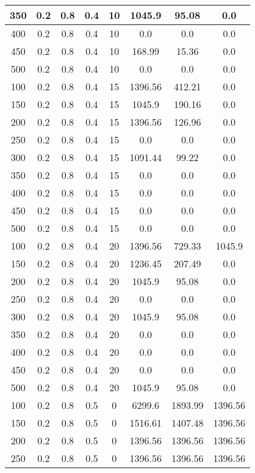 \documentclass[a4paper, 12pt]{extreport}
\begin{document}
\begin{itemize}
\begin{longtable}{|c|c|c|c|c|c|c|c|}
			350 & 0.2 & 0.8 & 0.4 & 10 & 1045.9 & 95.08 & 0.0 \\\hline
			400 & 0.2 & 0.8 & 0.4 & 10 & 0.0 & 0.0 & 0.0 \\\hline
			450 & 0.2 & 0.8 & 0.4 & 10 & 168.99 & 15.36 & 0.0 \\\hline
			500 & 0.2 & 0.8 & 0.4 & 10 & 0.0 & 0.0 & 0.0 \\\hline
			100 & 0.2 & 0.8 & 0.4 & 15 & 1396.56 & 412.21 & 0.0 \\\hline
			150 & 0.2 & 0.8 & 0.4 & 15 & 1045.9 & 190.16 & 0.0 \\\hline
			200 & 0.2 & 0.8 & 0.4 & 15 & 1396.56 & 126.96 & 0.0 \\\hline
			250 & 0.2 & 0.8 & 0.4 & 15 & 0.0 & 0.0 & 0.0 \\\hline
			300 & 0.2 & 0.8 & 0.4 & 15 & 1091.44 & 99.22 & 0.0 \\\hline
			350 & 0.2 & 0.8 & 0.4 & 15 & 0.0 & 0.0 & 0.0 \\\hline
			400 & 0.2 & 0.8 & 0.4 & 15 & 0.0 & 0.0 & 0.0 \\\hline
			450 & 0.2 & 0.8 & 0.4 & 15 & 0.0 & 0.0 & 0.0 \\\hline
			500 & 0.2 & 0.8 & 0.4 & 15 & 0.0 & 0.0 & 0.0 \\\hline
			100 & 0.2 & 0.8 & 0.4 & 20 & 1396.56 & 729.33 & 1045.9 \\\hline
			150 & 0.2 & 0.8 & 0.4 & 20 & 1236.45 & 207.49 & 0.0 \\\hline
			200 & 0.2 & 0.8 & 0.4 & 20 & 1045.9 & 95.08 & 0.0 \\\hline
			250 & 0.2 & 0.8 & 0.4 & 20 & 0.0 & 0.0 & 0.0 \\\hline
			300 & 0.2 & 0.8 & 0.4 & 20 & 1045.9 & 95.08 & 0.0 \\\hline
			350 & 0.2 & 0.8 & 0.4 & 20 & 0.0 & 0.0 & 0.0 \\\hline
			400 & 0.2 & 0.8 & 0.4 & 20 & 0.0 & 0.0 & 0.0 \\\hline
			450 & 0.2 & 0.8 & 0.4 & 20 & 0.0 & 0.0 & 0.0 \\\hline
			500 & 0.2 & 0.8 & 0.4 & 20 & 1045.9 & 95.08 & 0.0 \\\hline
			100 & 0.2 & 0.8 & 0.5 & 0 & 6299.6 & 1893.99 & 1396.56 \\\hline
			150 & 0.2 & 0.8 & 0.5 & 0 & 1516.61 & 1407.48 & 1396.56 \\\hline
			200 & 0.2 & 0.8 & 0.5 & 0 & 1396.56 & 1396.56 & 1396.56 \\\hline
			250 & 0.2 & 0.8 & 0.5 & 0 & 1396.56 & 1396.56 & 1396.56 \\\hline

\end{longtable}
\end{itemize}
\end{document}
